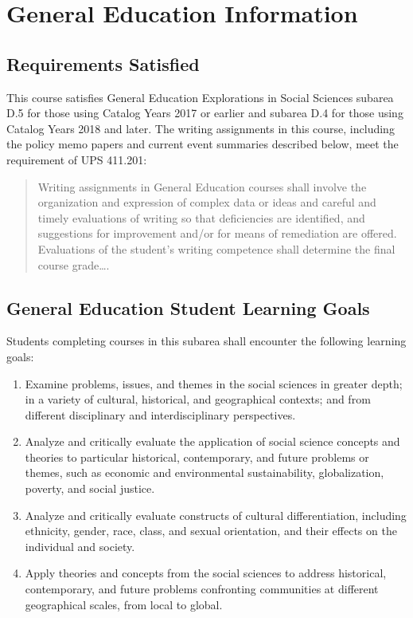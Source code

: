 \documentclass[12pt, letterpaper]{article}
\begin{document}
\section*{General Education Information}

\subsection*{Requirements Satisfied}

	This course satisfies General Education Explorations in Social Sciences subarea D.5 for those using Catalog Years 2017 or earlier and subarea D.4 for those using Catalog Years 2018 and later. The writing assignments in this course, including the policy memo papers and current event summaries described below, meet the requirement of UPS 411.201: 
	\begin{quote}Writing assignments in General Education courses shall involve the organization and expression of complex data or ideas and careful and timely evaluations of writing so that deficiencies are identified, and suggestions for improvement and/or for means of remediation are offered. Evaluations of the student's writing competence shall determine the final course grade\ldots .\end{quote}

\subsection*{General Education Student Learning Goals}

	Students completing courses in this subarea shall encounter the following learning goals:

\begin{enumerate}
	\item Examine problems, issues, and themes in the social sciences in greater depth; in a variety of cultural, historical, and geographical contexts; and from different disciplinary and interdisciplinary perspectives.
	\item Analyze and critically evaluate the application of social science concepts and theories to particular historical, contemporary, and future problems or themes, such as economic and environmental sustainability, globalization, poverty, and social justice.
	\item Analyze and critically evaluate constructs of cultural differentiation, including ethnicity, gender, race, class, and sexual orientation, and their effects on the individual and society.
	\item Apply theories and concepts from the social sciences to address historical, contemporary, and future problems confronting communities at different geographical scales, from local to global.
\end{enumerate}
\end{document}
